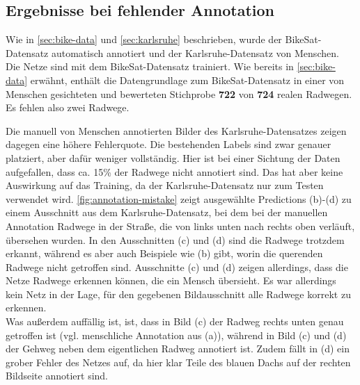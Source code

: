\subsection{Ergebnisse bei fehlender Annotation}

Wie in \autoref{sec:bike-data} und \ref{sec:karlsruhe} beschrieben, wurde der BikeSat-Datensatz automatisch 
annotiert und der Karlsruhe-Datensatz von Menschen. Die Netze sind mit dem BikeSat-Datensatz trainiert. 
Wie bereits in \autoref{sec:bike-data} erwähnt, enthält die Datengrundlage zum BikeSat-Datensatz 
in einer von Menschen gesichteten und bewerteten Stichprobe \textbf{722} von \textbf{724} realen Radwegen.
Es fehlen also zwei Radwege. 

Die manuell von Menschen annotierten Bilder des Karlsruhe-Datensatzes zeigen dagegen eine höhere 
Fehlerquote. Die bestehenden Labels sind zwar genauer platziert, aber dafür weniger vollständig. 
Hier ist bei einer Sichtung der Daten aufgefallen, dass ca. 15\% der Radwege nicht annotiert sind. 
Das hat aber keine Auswirkung auf das Training, da der Karlsruhe-Datensatz nur zum Testen verwendet wird.
\autoref{fig:annotation-mistake} zeigt ausgewählte Predictions (b)-(d) 
zu einem Ausschnitt aus dem Karlsruhe-Datensatz, bei dem bei der manuellen Annotation 
Radwege in der Straße, die von links unten nach rechts oben verläuft, übersehen wurden. 
In den Ausschnitten (c) und (d) sind die Radwege trotzdem erkannt, während es aber auch 
Beispiele wie (b) gibt, worin die querenden Radwege nicht getroffen sind. Ausschnitte (c) 
und (d) zeigen allerdings, dass die Netze Radwege erkennen können, die ein Mensch übersieht.
Es war allerdings kein Netz in der Lage, für den gegebenen Bildausschnitt alle Radwege korrekt 
zu erkennen. \\
Was außerdem auffällig ist, ist, dass in Bild (c) der Radweg rechts unten genau getroffen ist 
(vgl. menschliche Annotation aus (a)), während in Bild (c) und (d) der Gehweg neben dem eigentlichen 
Radweg annotiert ist. Zudem fällt in (d) ein grober Fehler des Netzes auf, da hier klar Teile des 
blauen Dachs auf der rechten Bildseite annotiert sind.


